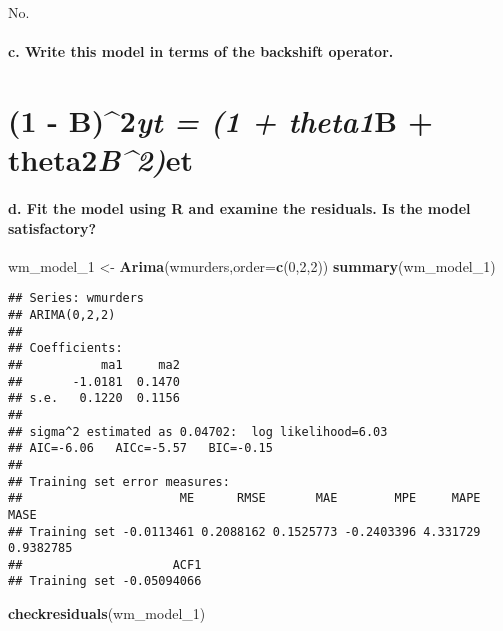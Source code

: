 \documentclass[]{article}
\newenvironment{Shaded}{\begin{snugshade}}{\end{snugshade}}
\newcommand{\KeywordTok}[1]{\textcolor[rgb]{0.13,0.29,0.53}{\textbf{#1}}}
\newcommand{\DataTypeTok}[1]{\textcolor[rgb]{0.13,0.29,0.53}{#1}}
\newcommand{\DecValTok}[1]{\textcolor[rgb]{0.00,0.00,0.81}{#1}}
\newcommand{\StringTok}[1]{\textcolor[rgb]{0.31,0.60,0.02}{#1}}
\newcommand{\NormalTok}[1]{#1}
\let\oldparagraph\paragraph
\renewcommand{\paragraph}[1]{\oldparagraph{#1}\mbox{}}
\begin{document}
No.

\paragraph{c. Write this model in terms of the backshift
operator.}\label{c.-write-this-model-in-terms-of-the-backshift-operator.}

\section{\texorpdfstring{(1 - B)\^{}2\emph{yt = (1 + theta1}B +
theta2\emph{B\^{}2)}et}{(1 - B)\^{}2yt = (1 + theta1B + theta2B\^{}2)et}}\label{b2yt-1-theta1b-theta2b2et}

\paragraph{d. Fit the model using R and examine the residuals. Is the
model
satisfactory?}\label{d.-fit-the-model-using-r-and-examine-the-residuals.-is-the-model-satisfactory}

\begin{Shaded}
\begin{Highlighting}[]
\NormalTok{wm_model_}\DecValTok{1}\NormalTok{ <-}\StringTok{ }\KeywordTok{Arima}\NormalTok{(wmurders,}\DataTypeTok{order=}\KeywordTok{c}\NormalTok{(}\DecValTok{0}\NormalTok{,}\DecValTok{2}\NormalTok{,}\DecValTok{2}\NormalTok{))}
\KeywordTok{summary}\NormalTok{(wm_model_}\DecValTok{1}\NormalTok{)}
\end{Highlighting}
\end{Shaded}

\begin{verbatim}
## Series: wmurders 
## ARIMA(0,2,2) 
## 
## Coefficients:
##           ma1     ma2
##       -1.0181  0.1470
## s.e.   0.1220  0.1156
## 
## sigma^2 estimated as 0.04702:  log likelihood=6.03
## AIC=-6.06   AICc=-5.57   BIC=-0.15
## 
## Training set error measures:
##                      ME      RMSE       MAE        MPE     MAPE      MASE
## Training set -0.0113461 0.2088162 0.1525773 -0.2403396 4.331729 0.9382785
##                     ACF1
## Training set -0.05094066
\end{verbatim}

\begin{Shaded}
\begin{Highlighting}[]
\KeywordTok{checkresiduals}\NormalTok{(wm_model_}\DecValTok{1}\NormalTok{)}
\end{Highlighting}
\end{Shaded}
\end{document}
